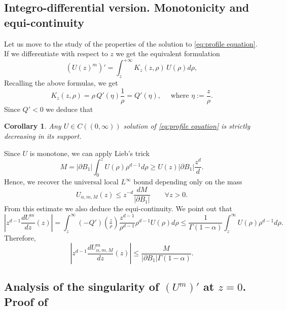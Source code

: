 \documentclass[a4paper]{article}
\newtheorem{corollary}[theorem]{Corollary}
\theoremstyle{definition}
\begin{document}
\subsection{Integro-differential version. Monotonicity and equi-continuity}
Let us move to the study of the properties of the solution to \eqref{eq:profile equation}. If we differentiate with respect to $z$ we get the equivalent formulation
\begin{equation}
  \label{intdiff. equation}
  (U(z)^{m})' = \int_z^{+\infty} K_z(z,\rho) \, U(\rho) d\rho,
\end{equation}
Recalling the above formulas, we get
$$
K_z(z,\rho)= \rho \, Q'(\eta)\frac1{\rho}= Q'(\eta), \quad \text{ where } \eta := \frac{z}{\rho}.
$$
Since $Q' < 0$ we deduce that
\begin{corollary}
  Any $U \in C((0,\infty))$ solution of \eqref{eq:profile equation} is strictly decreasing in its support.
\end{corollary}

Since $U$ is monotone, we can apply Lieb's trick
\begin{equation*}
  M = |\partial B_1| \int_0^z U(\rho) \rho^{d-1} d \rho  \ge U(z) |\partial B_1| \frac{z^d}{d}.
\end{equation*}
Hence, we recover the universal local $L^\infty$ bound depending only on the mass
\begin{equation}
  \label{eq:Lieb upper bound}
  U_{\alpha,m,M} (z) \le z^{-d} \frac{dM}{|\partial B_1|} \qquad \forall z > 0.
\end{equation}
From this estimate we also deduce the equi-continuity.
We point out that
\begin{equation*}
  \left| z^{d-1} \frac{dU^m}{dz} (z) \right| = \int_z^\infty (-Q')(\tfrac{z}{\rho}) \frac{z^{d-1}}{\rho^{d-1}} \rho^{d-1} U(\rho) d \rho \le \frac{1}{\Gamma(1-\alpha)}\int_{z}^\infty U(\rho)\rho^{d-1}d\rho .
\end{equation*}
Therefore,
\begin{equation}
  \label{eq:equicontinuity}
  \left| z^{d-1} \frac{dU_{\alpha,m,M}^m}{dz} (z) \right| \le \frac{M}{|\partial B_1| \Gamma(1-\alpha)}.
\end{equation}

%
%
%
%

%
%
%
%
%
%
%
%
%
%

%
%
%
%
%
%
%
%

%
\subsection{Analysis of the singularity of $(U^m)'$ at $z = 0$. Proof of }
\end{document}
